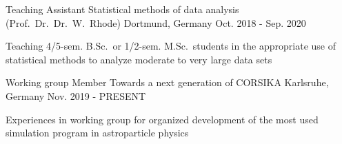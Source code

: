 \documentclass[11pt, a4paper]{Awesome-CV/awesome-cv}
\begin{document}
\begin{cventries}

    \cventry
    {Teaching Assistant} %
    {Statistical methods of data analysis (Prof.~Dr.~Dr.~W.~Rhode)} %
    {Dortmund, Germany} %
    {Oct. 2018 - Sep. 2020} %
    {
        \begin{cvitems} %
        \item {Teaching 4/5-sem. B.Sc.\ or 1/2-sem. M.Sc.~students in the appropriate use of statistical methods to analyze moderate to very large data sets}
        \end{cvitems}
    }

    \cventry
    {Working group Member} %
    {Towards a next generation of CORSIKA} %
    {Karlsruhe, Germany} %
    {Nov. 2019 - PRESENT} %
    {
        \begin{cvitems} %
        \item {Experiences in working group for organized development of the most used simulation program in astroparticle physics}
        \end{cvitems}
    }

\end{cventries}

\end{document}
